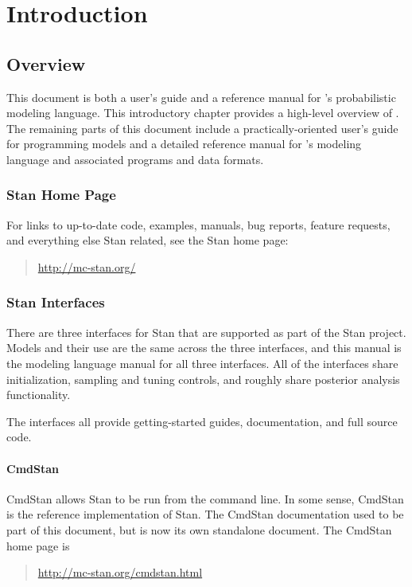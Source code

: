 \part{Introduction}


\chapter{Overview}

\noindent
This document is both a user's guide and a reference manual for
\Stan's probabilistic modeling language.  This introductory chapter
provides a high-level overview of \Stan. The remaining
parts of this document include a practically-oriented user's guide for
programming models and a detailed reference manual for \Stan's
modeling language and associated programs and data formats.

\section{Stan Home Page}

For links to up-to-date code, examples, manuals, bug reports,
feature requests, and everything else Stan related, see
the Stan home page:
%
\begin{quote}
\url{http://mc-stan.org/}
\end{quote}


\section{Stan Interfaces}

There are three interfaces for Stan that are supported as part of the
Stan project.  Models and their use are the same across the three
interfaces, and this manual is the modeling language manual for all
three interfaces.  All of the interfaces share initialization,
sampling and tuning controls, and roughly share posterior analysis
functionality.

The interfaces all provide getting-started guides, documentation, and
full source code.

\subsection{CmdStan}

CmdStan allows Stan to be run from the command line.  In some sense,
CmdStan is the reference implementation of Stan.  The CmdStan
documentation used to be part of this document, but is now its own
standalone document.  The CmdStan home page is
%
\begin{quote}
\url{http://mc-stan.org/cmdstan.html}
\end{quote}

